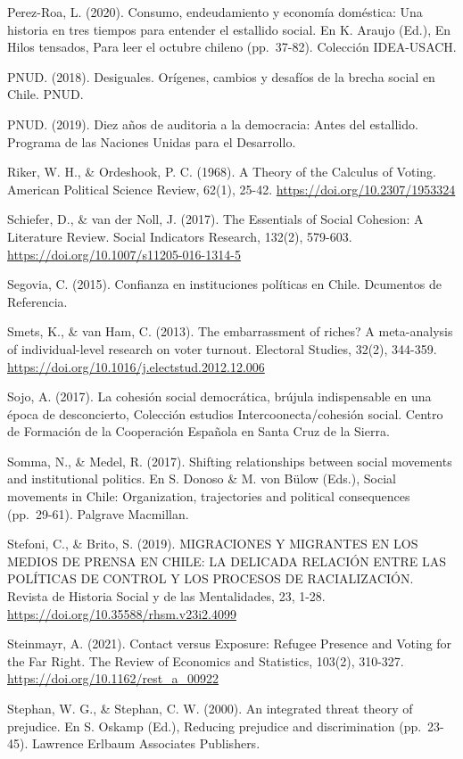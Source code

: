 \documentclass[
  12pt,
]{book}
\begin{document}
Perez-Roa, L. (2020). Consumo, endeudamiento y economía doméstica: Una historia en tres tiempos para entender el estallido social. En K. Araujo (Ed.), En Hilos tensados, Para leer el octubre chileno (pp.~37-82). Colección IDEA-USACH.

PNUD. (2018). Desiguales. Orígenes, cambios y desafíos de la brecha social en Chile. PNUD.

PNUD. (2019). Diez años de auditoria a la democracia: Antes del estallido. Programa de las Naciones Unidas para el Desarrollo.

Riker, W. H., \& Ordeshook, P. C. (1968). A Theory of the Calculus of Voting. American Political Science Review, 62(1), 25-42. \url{https://doi.org/10.2307/1953324}

Schiefer, D., \& van der Noll, J. (2017). The Essentials of Social Cohesion: A Literature Review. Social Indicators Research, 132(2), 579-603. \url{https://doi.org/10.1007/s11205-016-1314-5}

Segovia, C. (2015). Confianza en instituciones políticas en Chile. Dcumentos de Referencia.

Smets, K., \& van Ham, C. (2013). The embarrassment of riches? A meta-analysis of individual-level research on voter turnout. Electoral Studies, 32(2), 344-359. \url{https://doi.org/10.1016/j.electstud.2012.12.006}

Sojo, A. (2017). La cohesión social democrática, brújula indispensable en una época de desconcierto, Colección estudios Intercoonecta/cohesión social. Centro de Formación de la Cooperación Española en Santa Cruz de la Sierra.

Somma, N., \& Medel, R. (2017). Shifting relationships between social movements and institutional politics. En S. Donoso \& M. von Bülow (Eds.), Social movements in Chile: Organization, trajectories and political consequences (pp.~29-61). Palgrave Macmillan.

Stefoni, C., \& Brito, S. (2019). MIGRACIONES Y MIGRANTES EN LOS MEDIOS DE PRENSA EN CHILE: LA DELICADA RELACIÓN ENTRE LAS POLÍTICAS DE CONTROL Y LOS PROCESOS DE RACIALIZACIÓN. Revista de Historia Social y de las Mentalidades, 23, 1-28. \url{https://doi.org/10.35588/rhsm.v23i2.4099}

Steinmayr, A. (2021). Contact versus Exposure: Refugee Presence and Voting for the Far Right. The Review of Economics and Statistics, 103(2), 310-327. \url{https://doi.org/10.1162/rest_a_00922}

Stephan, W. G., \& Stephan, C. W. (2000). An integrated threat theory of prejudice. En S. Oskamp (Ed.), Reducing prejudice and discrimination (pp.~23-45). Lawrence Erlbaum Associates Publishers.
\end{document}
